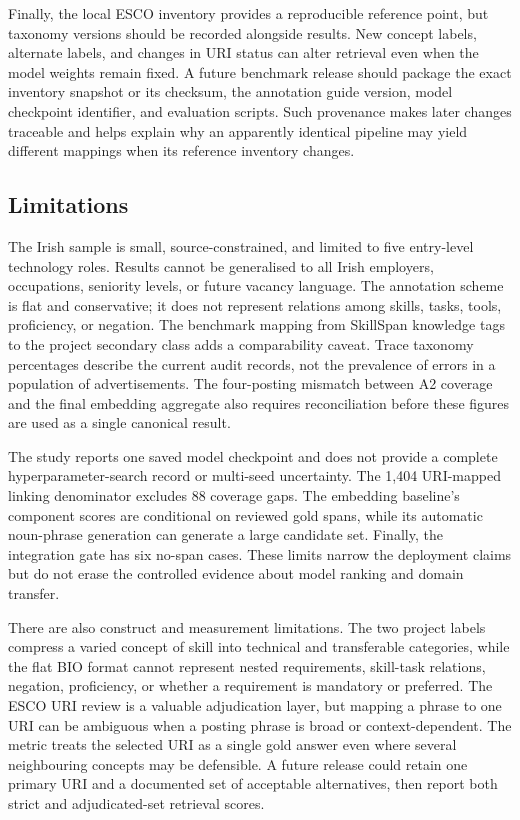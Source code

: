 \documentclass[conference]{IEEEtran}
\begin{document}
Finally, the local ESCO inventory provides a reproducible reference point, but taxonomy versions should be recorded alongside results. New concept labels, alternate labels, and changes in URI status can alter retrieval even when the model weights remain fixed. A future benchmark release should package the exact inventory snapshot or its checksum, the annotation guide version, model checkpoint identifier, and evaluation scripts. Such provenance makes later changes traceable and helps explain why an apparently identical pipeline may yield different mappings when its reference inventory changes.

\subsection{Limitations}
The Irish sample is small, source-constrained, and limited to five entry-level technology roles. Results cannot be generalised to all Irish employers, occupations, seniority levels, or future vacancy language. The annotation scheme is flat and conservative; it does not represent relations among skills, tasks, tools, proficiency, or negation. The benchmark mapping from SkillSpan knowledge tags to the project secondary class adds a comparability caveat. Trace taxonomy percentages describe the current audit records, not the prevalence of errors in a population of advertisements. The four-posting mismatch between A2 coverage and the final embedding aggregate also requires reconciliation before these figures are used as a single canonical result.

The study reports one saved model checkpoint and does not provide a complete hyperparameter-search record or multi-seed uncertainty. The 1,404 URI-mapped linking denominator excludes 88 coverage gaps. The embedding baseline's component scores are conditional on reviewed gold spans, while its automatic noun-phrase generation can generate a large candidate set. Finally, the integration gate has six no-span cases. These limits narrow the deployment claims but do not erase the controlled evidence about model ranking and domain transfer.

There are also construct and measurement limitations. The two project labels compress a varied concept of skill into technical and transferable categories, while the flat BIO format cannot represent nested requirements, skill-task relations, negation, proficiency, or whether a requirement is mandatory or preferred. The ESCO URI review is a valuable adjudication layer, but mapping a phrase to one URI can be ambiguous when a posting phrase is broad or context-dependent. The metric treats the selected URI as a single gold answer even where several neighbouring concepts may be defensible. A future release could retain one primary URI and a documented set of acceptable alternatives, then report both strict and adjudicated-set retrieval scores.
\end{document}
